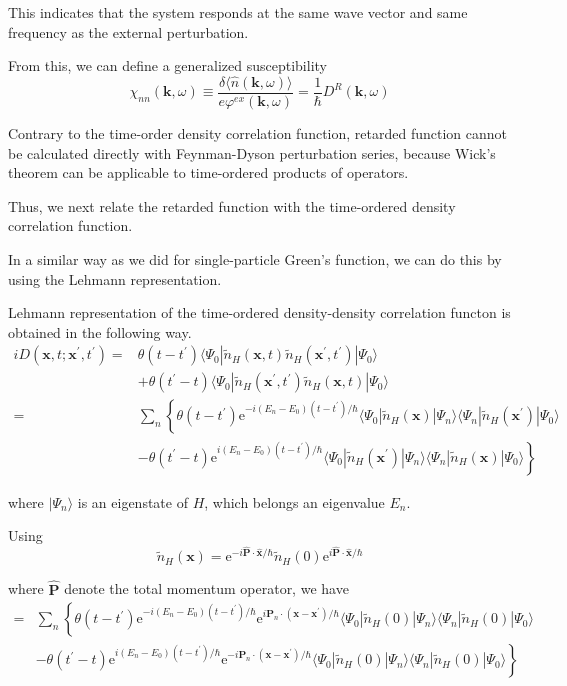 This indicates that the system responds at the same wave vector and same frequency as the external perturbation.

From this, we can define a generalized susceptibility
\begin{equation*} \label{Eqs3.1.15'} \tag{3.1.15'}
\chi_{nn}(\mathbf{k},\omega) \equiv \frac{\delta \langle \hat{n}(\mathbf{k},\omega) \rangle}{e \varphi^{ex}(\mathbf{k},\omega)} =\frac{1}{\hbar} D^R(\mathbf{k},\omega)
\end{equation*}

Contrary to the time-order density correlation function, retarded function cannot be calculated directly with Feynman-Dyson perturbation series, because Wick's theorem can be applicable to time-ordered products of operators.

Thus, we next relate the retarded function with the time-ordered density correlation function.

In a similar way as we did for single-particle Green's function, we can do this by using the Lehmann representation.

Lehmann representation of the time-ordered density-density correlation functon is obtained in the following way.
\[ \begin{split}
i D(\mathbf{x},t;\mathbf{x}^{'},t^{'}) =& \theta(t-t^{'}) \langle \Psi_0 | \tilde{n}_H(\mathbf{x},t) \tilde{n}_H(\mathbf{x}^{'},t^{'}) | \Psi_0 \rangle\\
&+\theta(t^{'}-t) \langle \Psi_0 | \tilde{n}_H(\mathbf{x}^{'},t^{'}) \tilde{n}_H(\mathbf{x},t) | \Psi_0 \rangle\\
=& \sum_n\left\{ \theta(t-t^{'})\mathrm{e}^{-i (E_n-E_0)(t-t^{'})/\hbar} \langle \Psi_0 | \tilde{n}_H(\mathbf{x})|\Psi_n \rangle \langle \Psi_n | \tilde{n}_H(\mathbf{x}^{'})|\Psi_0 \rangle \right.\\
&\left. -\theta(t^{'}-t)\mathrm{e}^{i (E_n-E_0)(t-t^{'})/\hbar} \langle \Psi_0 | \tilde{n}_H(\mathbf{x}^{'})|\Psi_n \rangle \langle \Psi_n | \tilde{n}_H(\mathbf{x})|\Psi_0 \rangle \right\}
\end{split} \]

where $|\Psi_n \rangle$ is an eigenstate of $H$, which belongs an eigenvalue $E_n$.

Using
\[ \tilde{n}_H(\mathbf{x}) = \mathrm{e}^{-i \hat{\mathbf{P}}\cdot\hat{\mathbf{x}}/\hbar} \tilde{n}_H(0)\mathrm{e}^{i\hat{\mathbf{P}} \cdot \hat{\mathbf{x}}/\hbar} \]

where $\hat{\mathbf{P}}$ denote the total momentum operator, we have
\[ \begin{split}
=& \sum_n\left\{ \theta(t-t^{'})\mathrm{e}^{-i (E_n-E_0)(t-t^{'})/\hbar} \mathrm{e}^{i \mathbf{P}_n \cdot (\mathbf{x}-\mathbf{x}^{'})/\hbar} \langle \Psi_0 | \tilde{n}_H(0)|\Psi_n \rangle \langle \Psi_n | \tilde{n}_H(0)|\Psi_0 \rangle \right.\\
&\left. -\theta(t^{'}-t)\mathrm{e}^{i (E_n-E_0)(t-t^{'})/\hbar}  \mathrm{e}^{-i \mathbf{P}_n \cdot (\mathbf{x}-\mathbf{x}^{'})/\hbar} \langle \Psi_0 | \tilde{n}_H(0)|\Psi_n \rangle \langle \Psi_n | \tilde{n}_H(0)|\Psi_0 \rangle \right\}
\end{split} \]

